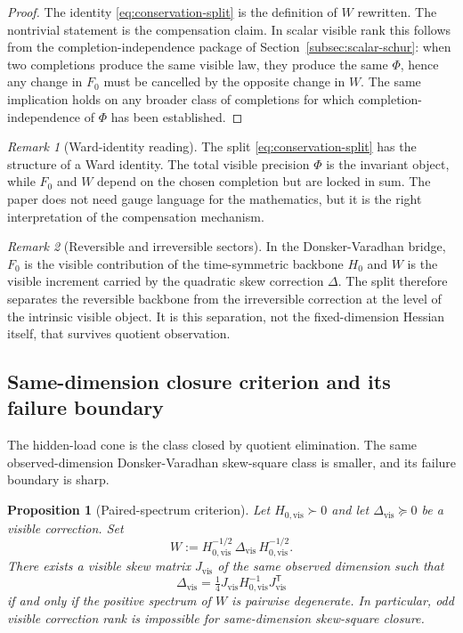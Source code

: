 \documentclass[11pt]{article}
\numberwithin{equation}{section}
\theoremstyle{thmcompact}
\newtheorem{proposition}[theorem]{Proposition}
\theoremstyle{remark}
\newtheorem*{remarkplain}{Remark}
\newenvironment{remark}[1][]%
{\begin{remarkbox}\begin{remarkplain}[#1]\normalfont}
		{\end{remarkplain}\end{remarkbox}}
\begin{document}
\begin{proof}
The identity \eqref{eq:conservation-split} is the definition of $W$ rewritten. The nontrivial statement is the compensation claim. In scalar visible rank this follows from the completion-independence package of Section~\ref{subsec:scalar-schur}: when two completions produce the same visible law, they produce the same $\Phi$, hence any change in $F_0$ must be cancelled by the opposite change in $W$. The same implication holds on any broader class of completions for which completion-independence of $\Phi$ has been established.
\end{proof}

\begin{remark}[Ward-identity reading]
The split \eqref{eq:conservation-split} has the structure of a Ward identity. The total visible precision $\Phi$ is the invariant object, while $F_0$ and $W$ depend on the chosen completion but are locked in sum. The paper does not need gauge language for the mathematics, but it is the right interpretation of the compensation mechanism.
\end{remark}

\begin{remark}[Reversible and irreversible sectors]
In the Donsker-Varadhan bridge, $F_0$ is the visible contribution of the time-symmetric backbone $H_0$ and $W$ is the visible increment carried by the quadratic skew correction $\Delta$. The split therefore separates the reversible backbone from the irreversible correction at the level of the intrinsic visible object. It is this separation, not the fixed-dimension Hessian itself, that survives quotient observation.
\end{remark}

\subsection{Same-dimension closure criterion and its failure boundary}

The hidden-load cone is the class closed by quotient elimination. The same observed-dimension Donsker-Varadhan skew-square class is smaller, and its failure boundary is sharp.

\begin{proposition}[Paired-spectrum criterion]\label{prop:paired-spectrum}
Let $H_{0,\mathrm{vis}}\succ0$ and let $\Delta_{\mathrm{vis}}\succeq0$ be a visible correction. Set
\begin{equation}\label{eq:whitened-visible}
W:=H_{0,\mathrm{vis}}^{-1/2}\,\Delta_{\mathrm{vis}}\,H_{0,\mathrm{vis}}^{-1/2}.
\end{equation}
There exists a visible skew matrix $J_{\mathrm{vis}}$ of the same observed dimension such that
\[
\Delta_{\mathrm{vis}}=\tfrac14 J_{\mathrm{vis}}H_{0,\mathrm{vis}}^{-1}J_{\mathrm{vis}}^{\mathsf T}
\]
if and only if the positive spectrum of $W$ is pairwise degenerate. In particular, odd visible correction rank is impossible for same-dimension skew-square closure.
\end{proposition}
\end{document}
